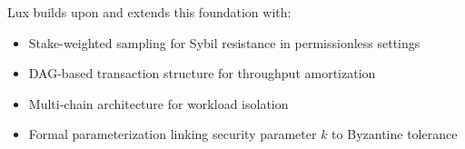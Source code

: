 Lux builds upon and extends this foundation with:
\begin{itemize}
    \item Stake-weighted sampling for Sybil resistance in permissionless settings
    \item DAG-based transaction structure for throughput amortization
    \item Multi-chain architecture for workload isolation
    \item Formal parameterization linking security parameter $k$ to Byzantine tolerance
\end{itemize}
